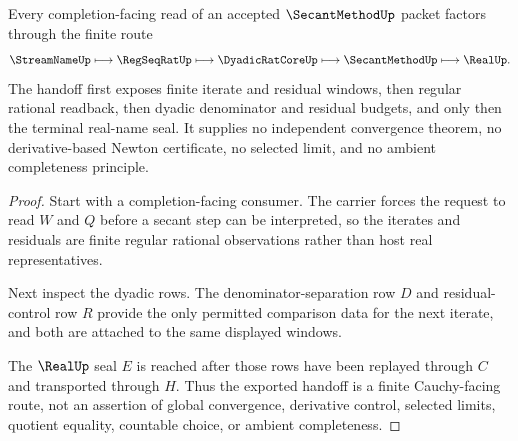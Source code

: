 \begin{theorem}
\label{thm:secant-method-cauchy-handoff}
Every completion-facing read of an accepted $\SecantMethodUp$ packet factors through the finite route
$$
\StreamNameUp \longmapsto \RegSeqRatUp \longmapsto \DyadicRatCoreUp \longmapsto \SecantMethodUp \longmapsto \RealUp .
$$
The handoff first exposes finite iterate and residual windows, then regular rational readback, then dyadic denominator and residual budgets, and only then the terminal real-name seal. It supplies no independent convergence theorem, no derivative-based Newton certificate, no selected limit, and no ambient completeness principle.
\end{theorem}
\begin{proof}
Start with a completion-facing consumer. The carrier forces the request to read $W$ and $Q$ before a secant step can be interpreted, so the iterates and residuals are finite regular rational observations rather than host real representatives.

Next inspect the dyadic rows. The denominator-separation row $D$ and residual-control row $R$ provide the only permitted comparison data for the next iterate, and both are attached to the same displayed windows.

The $\RealUp$ seal $E$ is reached after those rows have been replayed through $C$ and transported through $H$. Thus the exported handoff is a finite Cauchy-facing route, not an assertion of global convergence, derivative control, selected limits, quotient equality, countable choice, or ambient completeness.
\end{proof}




